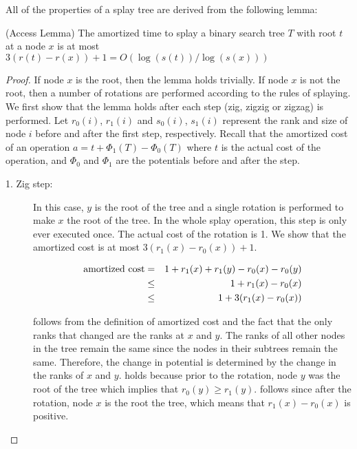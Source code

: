 {All of the properties of a splay tree are derived from the following
lemma:

\begin{lem}(Access Lemma)
The amortized time to splay a binary search tree $T$ with root $t$ at
a node $x$ is at most $3(r(t)-r(x)) + 1 = O(\log(s(t))/\log(s(x)))$
\end{lem}

\begin{proof}
If node $x$ is the root, then the lemma holds trivially. If node $x$ is not the root, then a number of rotations are performed according to the rules of splaying. We first show that the lemma holds after each step (zig, zigzig or zigzag) is performed. Let $r_0(i)$, $r_1(i)$ and $s_0(i)$, $s_1(i)$ represent the rank and size of node $i$ before and after the first step, respectively. Recall that the amortized cost of an operation $a = t + \Phi_1(T) - \Phi_0(T)$ where $t$ is the actual cost of the operation, and $\Phi_0$ and $\Phi_1$ are the potentials before and after the step.

\begin{description}
\item[1. Zig step:] In this case, $y$ is the root of the tree and a
single rotation is performed to make $x$ the root of the tree. In the
whole splay operation, this step is only ever executed once. The
actual cost of the rotation is 1. We show that the amortized cost is
at most $3(r_1(x) - r_0(x)) + 1$.

\begin{eqnarray}
\mbox{amortized cost} & =  & 1 + r_1(x) + r_1(y) - r_0(x) -r_0(y) 
	\eqlabel{a1}\\
                      &\leq& 1 + r_1(x) - r_0(x) \eqlabel{a2} \\
                      &\leq& 1 + 3(r_1(x) - r_0(x)) \eqlabel{a3}
\end{eqnarray}

 follows from the definition of amortized cost and
the fact that the only ranks that changed are the ranks at $x$ and
$y$. The ranks of all other nodes in the tree remain the same since
the nodes in their subtrees remain the same. Therefore, the change in
potential is determined by the change in the ranks of $x$ and
$y$.  holds because prior to the rotation, node $y$
was the root of the tree which implies that $r_0(y) \geq
r_1(y)$.  follows since after the rotation, node $x$
is the root the tree, which means that $r_1(x) - r_0(x)$ is positive.


\end{description}
\end{proof}}
